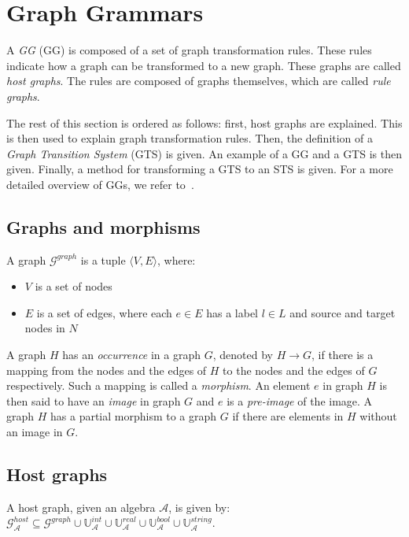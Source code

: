 \section{Graph Grammars}\label{sec:graph}
A \textit{GG} (GG) is composed of a set of graph transformation rules. These rules indicate how a graph can be transformed to a new graph. These graphs are called \textit{host graphs}. The rules are composed of graphs themselves, which are called \textit{rule graphs}.

The rest of this section is ordered as follows: first, host graphs are explained. This is then used to explain graph transformation rules. Then, the definition of a \textit{Graph Transition System} (GTS) is given. An example of a GG and a GTS is then given. Finally, a method for transforming a GTS to an STS is given. For a more detailed overview of GGs, we refer to~\cite{Rensink:graph_grammars, Heckel2006187, Andries1999}.

\subsection{Graphs and morphisms}
A graph $\mathcal{G}^{graph}$ is a tuple $\langle V, E\rangle$, where:
\begin{itemize}
  \item $V$ is a set of nodes
  \item $E$ is a set of edges, where each $e \in E$ has a label $l \in L$ and source and target nodes in $N$
\end{itemize}

A graph $H$ has an \textit{occurrence} in a graph $G$, denoted by $H \rightarrow G$, if there is a mapping from the nodes and the edges of $H$ to the nodes and the edges of $G$ respectively. Such a mapping is called a \textit{morphism}. An element $e$ in graph $H$ is then said to have an \textit{image} in graph $G$ and $e$ is a \textit{pre-image} of the image. A graph $H$ has a partial morphism to a graph $G$ if there are elements in $H$ without an image in $G$.

\subsection{Host graphs}
A host graph, given an algebra $\mathcal{A}$, is given by: $\mathcal{G}_\mathcal{A}^{host} \subseteq \mathcal{G}^{graph} \cup \mathbb{U}_\mathcal{A}^{int} \cup \mathbb{U}_\mathcal{A}^{real} \cup \mathbb{U}_\mathcal{A}^{bool} \cup \mathbb{U}_\mathcal{A}^{string}$.

